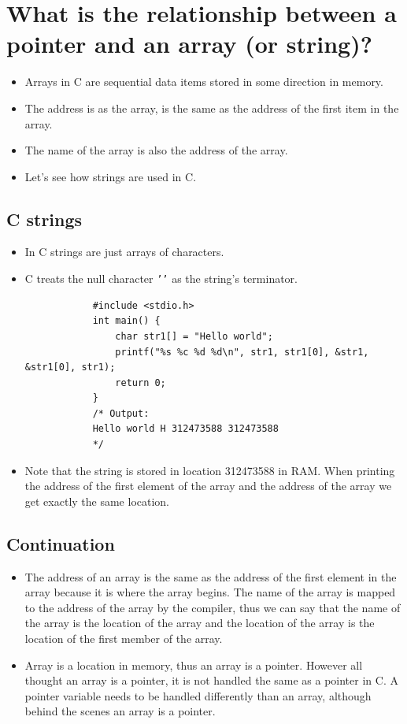 \section{What is the relationship between a pointer and an array (or string)?}
\begin{itemize}
    \item Arrays in C are sequential data items stored in some direction in memory.
    \item The address is as the array, is the same as the address of the first item in the array.
    \item The name of the array is also the address of the array.
    \item Let's see how strings are used in C.
\end{itemize}

\subsection{C strings}
\begin{itemize}
    \item In C strings are just arrays of characters.
    \item C treats the null character \texttt{'\0'} as the string's terminator.
        \begin{verbatim}
            #include <stdio.h>
            int main() {
                char str1[] = "Hello world";
                printf("%s %c %d %d\n", str1, str1[0], &str1, &str1[0], str1);
                return 0;
            }
            /* Output:
            Hello world H 312473588 312473588
            */
        \end{verbatim}

    \item Note that the string is stored in location 312473588 in RAM. When printing the address of the first element of the array and the address of the array we get exactly the same location.
\end{itemize}

\subsection{Continuation}
\begin{itemize}
    \item The address of an array is the same as the address of the first element in the array because it is where the array begins. The name of the array is mapped to the address of the array by the compiler, thus we can say that the name of the array is the location of the array and the location of the array is the location of the first member of the array.
    \item Array is a location in memory, thus an array is a pointer. However all thought an array is a pointer, it is not handled the same as a pointer in C. A pointer variable needs to be handled differently than an array, although behind the scenes an array is a pointer.
\end{itemize}

